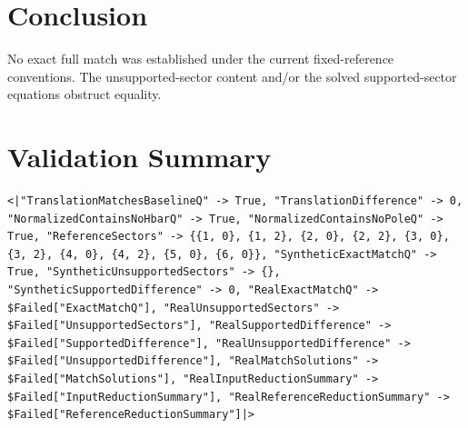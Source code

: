\documentclass[11pt]{article}
\begin{document}
\section{Conclusion}
No exact full match was established under the current fixed-reference conventions. The unsupported-sector content and/or the solved supported-sector equations obstruct equality.
\section{Validation Summary}
\begin{verbatim}
<|"TranslationMatchesBaselineQ" -> True, "TranslationDifference" -> 0, "NormalizedContainsNoHbarQ" -> True, "NormalizedContainsNoPoleQ" -> True, "ReferenceSectors" -> {{1, 0}, {1, 2}, {2, 0}, {2, 2}, {3, 0}, {3, 2}, {4, 0}, {4, 2}, {5, 0}, {6, 0}}, "SyntheticExactMatchQ" -> True, "SyntheticUnsupportedSectors" -> {}, "SyntheticSupportedDifference" -> 0, "RealExactMatchQ" -> $Failed["ExactMatchQ"], "RealUnsupportedSectors" -> $Failed["UnsupportedSectors"], "RealSupportedDifference" -> $Failed["SupportedDifference"], "RealUnsupportedDifference" -> $Failed["UnsupportedDifference"], "RealMatchSolutions" -> $Failed["MatchSolutions"], "RealInputReductionSummary" -> $Failed["InputReductionSummary"], "RealReferenceReductionSummary" -> $Failed["ReferenceReductionSummary"]|>
\end{verbatim}
\end{document}
